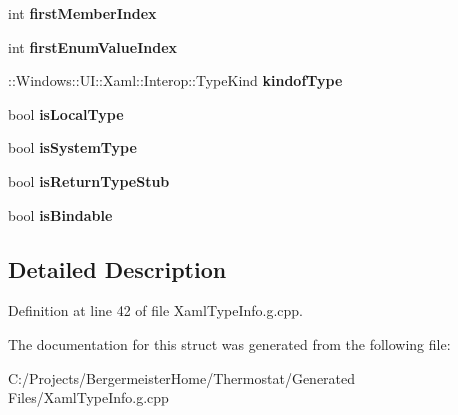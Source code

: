 \begin{DoxyCompactItemize}
int {\bfseries first\+Member\+Index}
\item 
\mbox{\label{struct_type_info_a5855e9582230c60baf51dbf169826eb8}} 
int {\bfseries first\+Enum\+Value\+Index}
\item 
\mbox{\label{struct_type_info_a14cc3e3f7308040c5d956b83933628c3}} 
\+::Windows\+::\+U\+I\+::\+Xaml\+::\+Interop\+::\+Type\+Kind {\bfseries kindof\+Type}
\item 
\mbox{\label{struct_type_info_a03fa39f04aeb505921a27cc7d1188c33}} 
bool {\bfseries is\+Local\+Type}
\item 
\mbox{\label{struct_type_info_aed510c71aa8bafb3d7371a70defd3980}} 
bool {\bfseries is\+System\+Type}
\item 
\mbox{\label{struct_type_info_a1480b09b916bd173390ed5a5333977ea}} 
bool {\bfseries is\+Return\+Type\+Stub}
\item 
\mbox{\label{struct_type_info_ad02282e9a35d686d639faa71ac7890e7}} 
bool {\bfseries is\+Bindable}
\end{DoxyCompactItemize}


\subsection{Detailed Description}


Definition at line 42 of file Xaml\+Type\+Info.\+g.\+cpp.



The documentation for this struct was generated from the following file\+:\begin{DoxyCompactItemize}
\item 
C\+:/\+Projects/\+Bergermeister\+Home/\+Thermostat/\+Generated Files/Xaml\+Type\+Info.\+g.\+cpp\end{DoxyCompactItemize}
